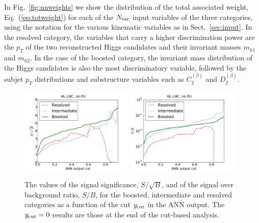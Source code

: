 %
In Fig.~\ref{fig:nnweights} we show
the distribution of the total associated weight,
Eq.~(\ref{eq:totweight}) for each of the $N_{\rm var}$ input
variables of the three categories, using the
notation for the various kinematic variables
as in Sect.~\ref{sec:input}.
%
%
In the 
resolved category, the variables that carry 
a higher discrimination power
are the $p_T$ of the two reconstructed Higgs candidates and
their invariant masses $m_{h1}$ and $m_{h2}$.
%
In the case of the boosted category, the invariant mass distribution
of the Higgs candidates is also the most discriminatory
variable, followed by the subjet $p_T$ distributions and
substructure variables such as $C_2^{(\beta)}$ and
$D_2^{(\beta)}$.




\begin{figure}[t]
\begin{center}
\includegraphics[width=0.48\textwidth]{plots/ssb_noPU.pdf}
\includegraphics[width=0.48\textwidth]{plots/sb_noPU.pdf}
\caption{\small
  The values of the signal significance, $S/\sqrt{B}$, and of the
  signal over background ratio, $S/B$, for the boosted, intermediate
  and resolved categories as a function of the cut
  $y_{\rm cut}$ in the ANN output.
  The $y_{\rm cut}=0$
  results are those at the end of the cut-based
  analysis.
}
\label{fig:sb_mva}
\end{center}
\end{figure}

